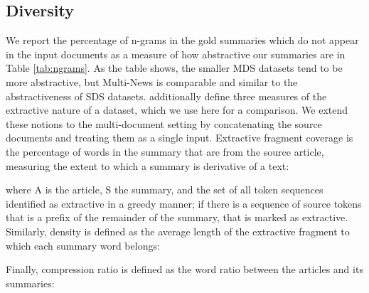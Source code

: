 \documentclass[11pt,a4paper]{article}
\begin{document}
\begin{table}[t!]
\centering
\small
{}
\caption{Percentage of n-grams in summaries which do not appear in the input documents , a measure of the abstractiveness, in relevant datasets.}
\label{tab:ngrams}
\end{table}
 
 
\subsection{Diversity}  \label{diversity_section}
We report the percentage of n-grams in the gold summaries which do not appear in the input documents as a measure of how abstractive our summaries are in Table \ref{tab:ngrams}. As the table shows, the smaller MDS datasets tend to be more abstractive, but Multi-News is comparable and similar to the abstractiveness of SDS datasets.  additionally define three measures of the extractive nature of a dataset, which we use here for a comparison. We extend these notions to the multi-document setting by concatenating the source documents and treating them as a single input. Extractive fragment coverage is the percentage of words in the summary that are from the source article, measuring the extent to which a summary is derivative of a text:

where A is the article, S the summary, and  the set of all token sequences identified as extractive in a greedy manner; if there is a sequence of source tokens that is a prefix of the remainder of the summary, that is marked as extractive. Similarly, density is defined as the average length of the extractive fragment to which each summary word belongs: 

Finally, compression ratio is defined as the word ratio between the articles and its summaries:
\end{document}
